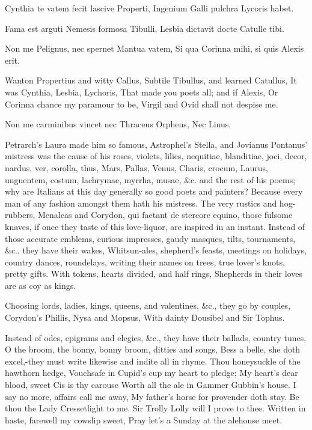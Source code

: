 {Cynthia te vatem fecit lascive Properti,
Ingenium Galli pulchra Lycoris habet.

Fama est arguti Nemesis formosa Tibulli,
Lesbia dictavit docte Catulle tibi.

Non me Pelignus, nec spernet Mantua vatem,
Si qua Corinna mihi, si quis Alexis erit.


Wanton Propertius and witty Callus,
Subtile Tibullus, and learned Catullus,
It was Cynthia, Lesbia, Lychoris,
That made you poets all; and if Alexis,
Or Corinna chance my paramour to be,
Virgil and Ovid shall not despise me.

Non me carminibus vincet nec Thraceus Orpheus,
Nec Linus.

Petrarch's Laura made him so famous, Astrophel's Stella, and Jovianus
Pontanus' mistress was the cause of his roses, violets, lilies,
nequitiae, blanditiae, joci, decor, nardus, ver, corolla, thus, Mars,
Pallas, Venus, Charis, crocum, Laurus, unguentem, costum, lachrymae,
myrrha, musae, \&c. and the rest of his poems; why are Italians at this
day generally so good poets and painters? Because every man of any
fashion amongst them hath his mistress. The very rustics and
hog-rubbers, Menalcas and Corydon, qui faetant de stercore equino,
those fulsome knaves, if once they taste of this love-liquor, are
inspired in an instant. Instead of those accurate emblems, curious
impresses, gaudy masques, tilts, tournaments, \&c., they have their
wakes, Whitsun-ales, shepherd's feasts, meetings on holidays, country
dances, roundelays, writing their names on trees, true lover's
knots, pretty gifts.
With tokens, hearts divided, and half rings,
Shepherds in their loves are as coy as kings.

Choosing lords, ladies, kings, queens, and valentines, \&c., they go by
couples,
Corydon's Phillis, Nysa and Mopsus,
With dainty Dousibel and Sir Tophus.

Instead of odes, epigrams and elegies, \&c., they have their ballads,
country tunes, O the broom, the bonny, bonny broom, ditties and songs,
Bess a belle, she doth excel,-they must write likewise and indite all
in rhyme.
Thou honeysuckle of the hawthorn hedge,
Vouchsafe in Cupid's cup my heart to pledge;
My heart's dear blood, sweet Cis is thy carouse
Worth all the ale in Gammer Gubbin's house.
I say no more, affairs call me away,
My father's horse for provender doth stay.
Be thou the Lady Cressetlight to me.
Sir Trolly Lolly will I prove to thee.
Written in haste, farewell my cowslip sweet,
Pray let's a Sunday at the alehouse meet.

}
